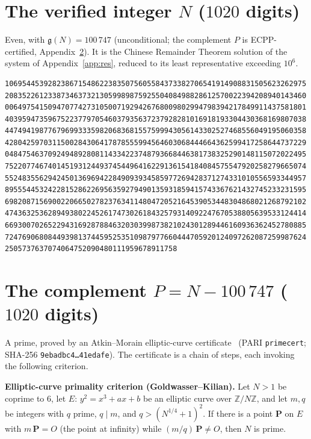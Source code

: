 \documentclass[11pt]{article}
\theoremstyle{plain}
\theoremstyle{definition}
\theoremstyle{remark}
\newcommand{\N}{N}
\newcommand{\g}{\mathfrak{g}}
\begin{document}
\section{The verified integer $\N$ ($1020$ digits)}\label{app:N}
Even, with $\g(\N)=100\,747$ (unconditional; the complement $P$ is ECPP-certified,
Appendix~\ref{app:P}). It is the Chinese Remainder Theorem solution of the system
of Appendix~\ref{app:res}, reduced to its least representative exceeding $10^{6}$.
\begin{verbatim}
1069544539282386715486223835075605584373382706541914908831505623262975
2083522612338734637321305998987592550408498828612570022394208940143460
0064975415094707742731050071929426768009802994798394217849911437581801
4039594735967522377970546037935637237928281016918193304430368169807038
4474941987767969933359820683681557599943056143302527468556049195060358
4280425970311500284306417878555994564603068444664362599417258644737229
0484754637092494892808114334223748793668446381738325290148115072022495
7522077467401451931244937454496416229136154184084575547920258279665074
5524835562942450136969422849093934585977269428371274331010556593344957
8955544532422815286226956359279490135931859415743367621432745233231595
6982087156900220665027823763411480472052164539053448304868021268792102
4743632536289493802245261747302618432579314092247670538805639533124414
6693007026522943169287884632030399873821024301289446160936362452780885
7247690680844939813744595253510987977660444705920124097262087259987624
2505737637074064752090480111959678911758
\end{verbatim}


\section{The complement $P=\N-100\,747$ ($1020$ digits)}\label{app:P}
A prime, proved by an Atkin--Morain elliptic-curve certificate~\cite{AtkinMorain}
(PARI \texttt{primecert}; SHA-256 \texttt{9ebadbc4\dots41edafe}). The certificate
is a chain of steps, each invoking the following criterion.

\smallskip
\noindent\textbf{Elliptic-curve primality criterion (Goldwasser--Kilian).} Let
$N>1$ be coprime to $6$, let $E:\,y^2=x^3+ax+b$ be an elliptic curve over
$\mathbb Z/N\mathbb Z$, and let $m,q$ be integers with $q$ prime, $q\mid m$, and
$q>(N^{1/4}+1)^2$. If there is a point $\mathbf P$ on $E$ with $m\,\mathbf P=O$
(the point at infinity) while $(m/q)\,\mathbf P\neq O$, then $N$ is prime.
\end{document}
